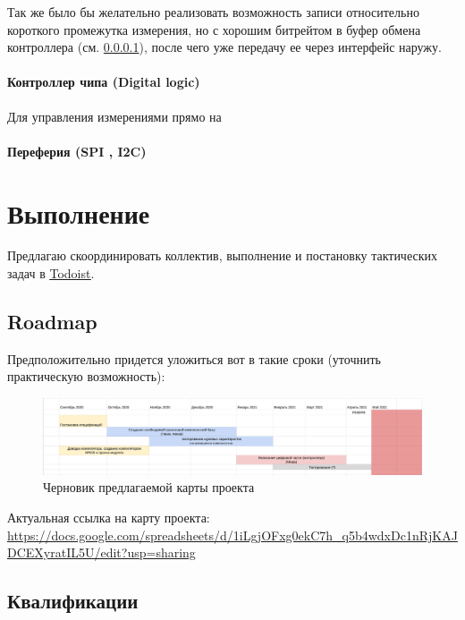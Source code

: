 \documentclass[a4paper,12pt]{article} %
\begin{document}
Так же было бы желательно реализовать возможность записи относительно короткого промежутка измерения, но с хорошим битрейтом в буфер обмена контроллера (см. \ref{digital}), после чего уже передачу ее через интерфейс наружу.

\paragraph{ Контроллер чипа (Digital logic)} \label{digital}

Для управления измерениями прямо на 

\paragraph{ Переферия  (SPI , I2C)}



\section{Выполнение}





Предлагаю скоординировать коллектив, выполнение и постановку тактических задач в \underline {\href{todoist.com}{Todoist}}.

\subsection{Roadmap}

Предположительно придется уложиться вот в такие сроки (уточнить практическую возможность):


\begin{figure}[h]
\centering
\includegraphics[width=1.1\textwidth]{roadmap.png}
\caption{ Черновик предлагаемой карты проекта}
\end{figure}

Актуальная ссылка на карту проекта:  \url {https://docs.google.com/spreadsheets/d/1iLgjOFxg0ekC7h_q5b4wdxDc1nRjKAJDCEXyratIL5U/edit?usp=sharing}



\subsection{Квалификации}
\end{document}
